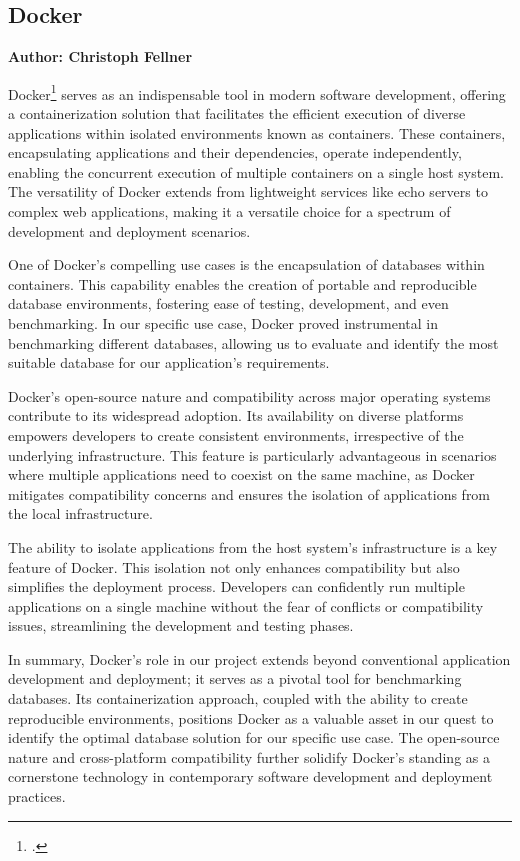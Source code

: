 \subsection{Docker}
\textbf{Author: Christoph Fellner}

Docker\footcite{docker} serves as an indispensable tool in modern software development, offering a containerization solution that facilitates the efficient 
execution of diverse applications within isolated environments known as containers. These containers, encapsulating applications and their dependencies, operate 
independently, enabling the concurrent execution of multiple containers on a single host system. The versatility of Docker extends from lightweight services 
like echo servers to complex web applications, making it a versatile choice for a spectrum of development and deployment scenarios.\newline

One of Docker's compelling use cases is the encapsulation of databases within containers. This capability enables the creation of portable and reproducible 
database environments, fostering ease of testing, development, and even benchmarking. In our specific use case, Docker proved instrumental in benchmarking 
different databases, allowing us to evaluate and identify the most suitable database for our application's requirements.\newline

Docker's open-source nature and compatibility across major operating systems contribute to its widespread adoption. Its availability on diverse platforms 
empowers developers to create consistent environments, irrespective of the underlying infrastructure. This feature is particularly advantageous in scenarios 
where multiple applications need to coexist on the same machine, as Docker mitigates compatibility concerns and ensures the isolation of applications from the 
local infrastructure.\newline

The ability to isolate applications from the host system's infrastructure is a key feature of Docker. This isolation not only enhances compatibility but also 
simplifies the deployment process. Developers can confidently run multiple applications on a single machine without the fear of conflicts or compatibility 
issues, streamlining the development and testing phases.\newline

In summary, Docker's role in our project extends beyond conventional application development and deployment; it serves as a pivotal tool for benchmarking 
databases. Its containerization approach, coupled with the ability to create reproducible environments, positions Docker as a valuable asset in our quest to 
identify the optimal database solution for our specific use case. The open-source nature and cross-platform compatibility further solidify Docker's standing as 
a cornerstone technology in contemporary software development and deployment practices.

\filbreak
